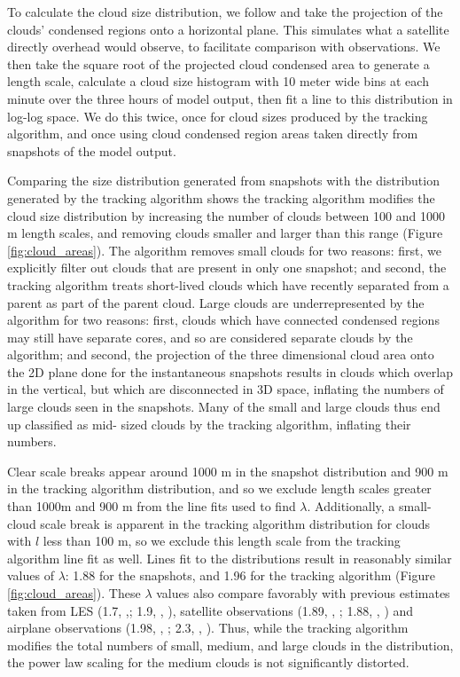 \documentclass[acp]{copernicus}
\begin{document}
To calculate the cloud size distribution, we follow \cite{Neggers2003} and 
take the projection of the clouds' condensed regions onto a horizontal plane. 
This simulates what a satellite directly overhead would observe, to facilitate 
comparison with observations.  We then take the square root of the projected 
cloud condensed area to generate a length scale, calculate a cloud size 
histogram with 10 meter wide bins at each minute over the three hours of model 
output, then fit a line to this distribution in log-log space.  We do this 
twice, once for cloud sizes produced by the tracking algorithm, and once using 
cloud condensed region areas taken directly from snapshots of the model output.

Comparing the size distribution generated from snapshots with the distribution 
generated by the tracking algorithm shows the tracking algorithm modifies
the cloud size distribution by increasing the number of clouds between 100 and 
1000 m length scales, and removing clouds smaller and larger than this range 
(Figure \ref{fig:cloud_areas}).  The algorithm removes small clouds for two 
reasons: first, we explicitly filter out clouds that are present in only one 
snapshot; and second, the tracking algorithm treats short-lived clouds which 
have recently separated from a parent as part of the parent cloud.  Large
clouds are underrepresented by the algorithm for two reasons: first, clouds 
which have connected condensed regions may still have separate cores, and so 
are considered separate clouds by the algorithm; and second, the projection of 
the three dimensional cloud area onto the 2D plane done for the instantaneous 
snapshots results in clouds which overlap in the vertical, but which are 
disconnected in 3D space, inflating the numbers of large clouds seen in the 
snapshots.  Many of the small and large clouds thus end up classified as mid-
sized clouds by the tracking algorithm, inflating their numbers.

Clear scale breaks appear around 1000 m in the snapshot distribution and 900 m 
in the tracking algorithm distribution, and so we exclude length scales greater 
than 1000m and 900 m from the line fits used to find $\lambda$.  Additionally, 
a small-cloud scale break is apparent in the tracking algorithm distribution 
for clouds with $l$ less than 100 m, so we exclude this length scale from the 
tracking algorithm line fit as well.  Lines fit to the distributions result in 
reasonably similar values of $\lambda$: 1.88 for the snapshots, and 1.96 for 
the tracking algorithm (Figure \ref{fig:cloud_areas}).  These $\lambda$ 
values also compare favorably with previous estimates taken from LES 
(1.7, \citeauthor{Neggers2003},\citeyear{Neggers2003}; 1.9, 
\citeauthor{Jiang2008}, \citeyear{Jiang2008}), 
satellite observations (1.89, \citeauthor{Cahalan1989},
\citeyear{Cahalan1989}; 1.88, \citeauthor{Zhao2007}, \citeyear{Zhao2007})
and airplane observations (1.98, \citeauthor{Benner1998}, 
\citeyear{Benner1998}; 2.3, \citeauthor{Jiang2008}, \citeyear{Jiang2008}).
Thus, while the tracking algorithm modifies the total numbers of small, medium, 
and large clouds in the distribution, the power law scaling for the medium 
clouds is not significantly distorted.
\end{document}
